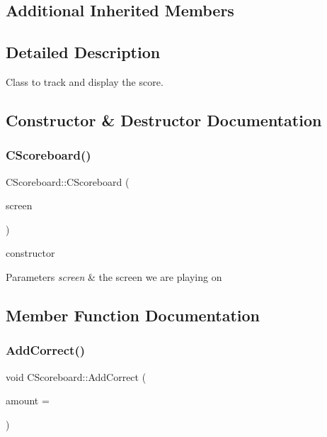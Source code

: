 \subsection*{Additional Inherited Members}


\subsection{Detailed Description}
Class to track and display the score. 

\subsection{Constructor \& Destructor Documentation}
\mbox{\label{class_c_scoreboard_ad3a0f3c1030fdd94c50ce7b61a412296}} 
\subsubsection{\texorpdfstring{CScoreboard()}{CScoreboard()}}
{\footnotesize\ttfamily C\+Scoreboard\+::\+C\+Scoreboard (\begin{DoxyParamCaption}\item[{\mbox{\hyperlink{class_c_screen}{C\+Screen}} $\ast$}]{screen }\end{DoxyParamCaption})}

constructor 
\begin{DoxyParams}{Parameters}
{\em screen} & the screen we are playing on \\
\hline
\end{DoxyParams}


\subsection{Member Function Documentation}
\mbox{\label{class_c_scoreboard_ab171509b39d2604fe9ba65a4a8205fc1}} 
\subsubsection{\texorpdfstring{AddCorrect()}{AddCorrect()}}
{\footnotesize\ttfamily void C\+Scoreboard\+::\+Add\+Correct (\begin{DoxyParamCaption}\item[{int}]{amount = {} }\end{DoxyParamCaption})\hspace{0.3cm}{\ttfamily [inline]}}


